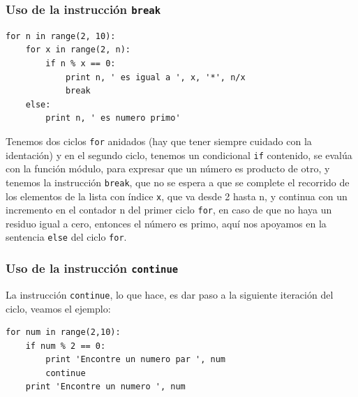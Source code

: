\begin{frame}[fragile]
\frametitle{Uso de la instrucción \texttt{break}}
\begin{lstlisting}
for n in range(2, 10):
    for x in range(2, n):
        if n % x == 0:
            print n, ' es igual a ', x, '*', n/x
            break
    else:
        print n, ' es numero primo'
\end{lstlisting}
\end{frame}
\begin{frame}
Tenemos dos ciclos \texttt{for} anidados (hay que tener siempre cuidado con la identación) y en el segundo ciclo, tenemos un condicional \texttt{if} contenido, se evalúa con la función módulo, para expresar que un número es producto de otro, y tenemos la instrucción \texttt{break}, que no se espera a que se complete el recorrido de los elementos de la lista con índice \texttt{x}, que va desde 2 hasta n, y continua con un incremento en el contador n del primer ciclo \texttt{for}, en caso de que no haya un residuo igual a cero, entonces el número es primo, aquí nos apoyamos en la sentencia \texttt{else} del ciclo \texttt{for}.
\end{frame}
\begin{frame}[fragile]
\frametitle{Uso de la instrucción \texttt{continue}}
La instrucción \texttt{continue}, lo que hace, es dar paso a la siguiente iteración del ciclo, veamos el ejemplo:
\begin{lstlisting}
for num in range(2,10):
    if num % 2 == 0:
        print 'Encontre un numero par ', num
        continue
    print 'Encontre un numero ', num
\end{lstlisting}
\end{frame}
